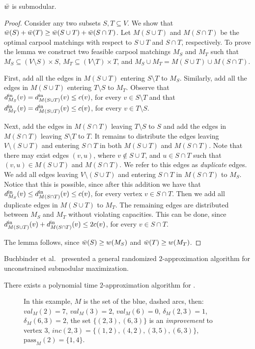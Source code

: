 \begin{lemma}
$\barw$ is submodular.
\end{lemma}
\begin{proof}
Consider any two subsets $S, T \subseteq V$.  We show that $\barw(S)
+ \barw(T) \geq \barw(S \cup T) + \barw(S \cap T)$.
%
Let $M(S \cup T)$ and $M(S \cap T)$ be the optimal carpool matchings
with respect to $S \cup T$ and $S \cap T$, respectively.
%
To prove the lemma we construct two feasible carpool matchings $M_S$
and $M_T$ such that $M_S \subseteq (V \setminus S) \times S$,
$M_T \subseteq (V \setminus T) \times T$, and $M_S \cup M_T = M(S \cup
T) \cup M(S \cap T)$.

First, add all the edges in $M(S \cup T)$ entering $S \setminus T$ to
$M_S$.  Similarly, add all the edges in $M(S \cup T)$ entering
$T \setminus S$ to $M_T$.  Observe that $\din[M_S](v) = \din[M(S \cup
T)](v) \leq c(v)$, for every $v \in S \setminus T$ and that
$\din[M_T](v) = \din[M(S \cup T)](v) \leq c(v)$, for every $v \in
T \setminus S$.

Next, add the edges in $M(S \cap T)$ leaving $T \setminus S$ to $S$
and add the edges in $M(S \cap T)$ leaving $S \setminus T$ to $T$.
%
It remains to distribute the edges leaving $V \setminus (S \cup T)$
and entering $S \cap T$ in both $M(S \cup T)$ and $M(S \cap T)$.  Note
that there may exist edges $(v,u)$, where $v \not\in S \cup T$, and
$u \in S \cap T$ such that $(v,u) \in M(S \cup T)$ and $M(S \cap T)$.
We refer to this edges as \emph{duplicate} edges.
%
We add all edges leaving $V \setminus (S \cup T)$ and entering $S \cap
T$ in $M(S \cap T)$ to $M_S$.  Notice that this is possible, since
after this addition we have that $\din[M_S](v) \leq \din[M(S \cap
T)](v) \leq c(v)$, for every vertex $v \in S \cap T$.
%
Then we add all duplicate edges in $M(S \cup T)$ to $M_T$.
%
The remaining edges are distributed between $M_S$ and $M_T$ without
violating capacities.  This can be done, since $\din[M(S \cup T)](v)
+ \din[M(S \cap T)](v) \leq 2c(v)$, for every $v \in S \cap T$.

The lemma follows, since $\barw(S) \geq w(M_S)$ and $\barw(T) \geq
w(M_T)$.
\end{proof}

Buchbinder et al.~\cite{BFNS15,buchbinder2016deterministic} presented a
general randomized $2$-approximation algorithm for unconstrained submodular maximization.

\begin{theorem}
There exists a polynomial time $2$-approximation algorithm for \carpool.
\end{theorem}

\begin{figure}
\centering

\caption[]{
\label{fig:defs}
In this example, $M$ is the set of the blue, dashed arcs, then:
$val_M(2) = 7$,
$val_M(3) = 2$,
$val_M(6) = 0$,
$\delta_M(2, 3) = 1$,
$\delta_M(6, 3) = 2$,
the set $\{(2,3), (6,3)\}$ is an \emph{improvement} to vertex 3,
$inc(2,3) = \{(1,2),(4,2),(3,5),(6,3)\}$,
$\text{pass}_M(2) = \{1, 4\}$.
}
\end{figure}
